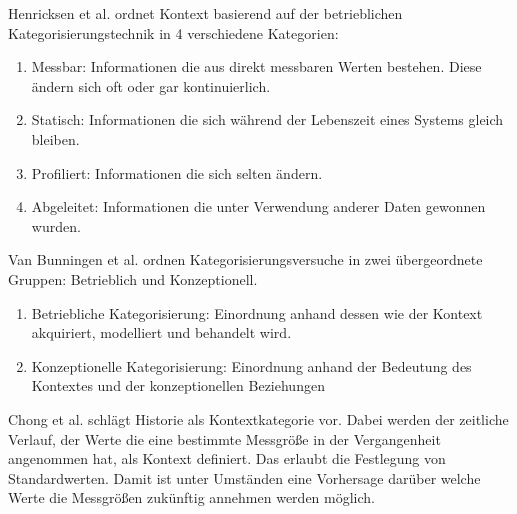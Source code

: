 Henricksen et al.\cite{henricksen2003framework} ordnet Kontext basierend auf der betrieblichen Kategorisierungstechnik in 4 verschiedene Kategorien:
\begin{enumerate}
\item {Messbar: Informationen die aus direkt messbaren Werten bestehen. Diese ändern sich oft oder gar kontinuierlich. }
\item {Statisch: Informationen die sich während der Lebenszeit eines Systems gleich bleiben.}
\item {Profiliert: Informationen die sich selten ändern.}
\item {Abgeleitet: Informationen die unter Verwendung anderer Daten gewonnen wurden. }
\end{enumerate}
Van Bunningen et al. \cite{van2005context} ordnen Kategorisierungsversuche in zwei übergeordnete Gruppen: Betrieblich und Konzeptionell. 
\begin{enumerate}
\item{Betriebliche Kategorisierung: Einordnung anhand dessen wie der Kontext akquiriert, modelliert und behandelt wird.}
\item{Konzeptionelle Kategorisierung: Einordnung anhand der Bedeutung des Kontextes und der konzeptionellen Beziehungen} %
\end{enumerate}

Chong et al.\cite{chong_context-aware_nodate} schlägt Historie als Kontextkategorie vor. Dabei werden der zeitliche Verlauf, der Werte die eine bestimmte Messgröße in der Vergangenheit angenommen hat, als Kontext definiert. Das erlaubt die Festlegung von Standardwerten. Damit ist unter Umständen eine Vorhersage darüber welche Werte die Messgrößen zukünftig annehmen werden möglich.



